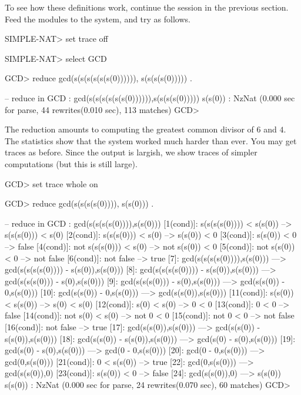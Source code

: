 \documentclass[a4paper]{memoir}
\begin{document}
To see how these definitions work, continue the session in the previous
section. Feed the modules to the system, and try as follows.
\begin{vvtm}
\begin{ccode}
  SIMPLE-NAT> set trace off

  SIMPLE-NAT> select GCD

  GCD> reduce gcd(s(s(s(s(s(s(0)))))), s(s(s(s(0))))) .

  -- reduce in GCD : gcd(s(s(s(s(s(s(0)))))),s(s(s(s(0)))))
  s(s(0)) : NzNat
  (0.000 sec for parse, 44 rewrites(0.010 sec), 113 matches)
  GCD>  
\end{ccode}
\end{vvtm}
The reduction amounts to computing the greatest common divisor of
$6$ and $4$. The statistics show that the system worked much harder
than ever. You may get traces as before. Since the output is largish,
we show traces of simpler computations (but this is still large).
\begin{vvtm}
\begin{ccode}
  GCD> set trace whole on

  GCD> reduce gcd(s(s(s(s(0)))), s(s(0))) .

  -- reduce in GCD : gcd(s(s(s(s(0)))),s(s(0)))
  [1(cond)]: s(s(s(s(0)))) < s(s(0))
     --> s(s(s(0))) < s(0)
  [2(cond)]: s(s(s(0))) < s(0)
     --> s(s(0)) < 0
  [3(cond)]: s(s(0)) < 0
     --> false
  [4(cond)]: not s(s(s(0))) < s(0)
     --> not s(s(0)) < 0
  [5(cond)]: not s(s(0)) < 0
     --> not false
  [6(cond)]: not false
     --> true
  [7]: gcd(s(s(s(s(0)))),s(s(0)))
   ---> gcd(s(s(s(s(0)))) - s(s(0)),s(s(0)))
  [8]: gcd(s(s(s(s(0)))) - s(s(0)),s(s(0)))
   ---> gcd(s(s(s(0))) - s(0),s(s(0)))
  [9]: gcd(s(s(s(0))) - s(0),s(s(0)))
   ---> gcd(s(s(0)) - 0,s(s(0)))
  [10]: gcd(s(s(0)) - 0,s(s(0)))
   ---> gcd(s(s(0)),s(s(0)))
  [11(cond)]: s(s(0)) < s(s(0))
     --> s(0) < s(0)
  [12(cond)]: s(0) < s(0)
     --> 0 < 0
  [13(cond)]: 0 < 0
     --> false
  [14(cond)]: not s(0) < s(0)
     --> not 0 < 0
  [15(cond)]: not 0 < 0
     --> not false
  [16(cond)]: not false
     --> true
  [17]: gcd(s(s(0)),s(s(0)))
   ---> gcd(s(s(0)) - s(s(0)),s(s(0)))
  [18]: gcd(s(s(0)) - s(s(0)),s(s(0)))
   ---> gcd(s(0) - s(0),s(s(0)))
  [19]: gcd(s(0) - s(0),s(s(0)))
   ---> gcd(0 - 0,s(s(0)))
  [20]: gcd(0 - 0,s(s(0)))
   ---> gcd(0,s(s(0)))
  [21(cond)]: 0 < s(s(0))
     --> true
  [22]: gcd(0,s(s(0)))
   ---> gcd(s(s(0)),0)
  [23(cond)]: s(s(0)) < 0
     --> false
  [24]: gcd(s(s(0)),0)
   ---> s(s(0))
  s(s(0)) : NzNat
  (0.000 sec for parse, 24 rewrites(0.070 sec), 60 matches)
  GCD> 
\end{ccode}
\end{vvtm}
\end{document}
